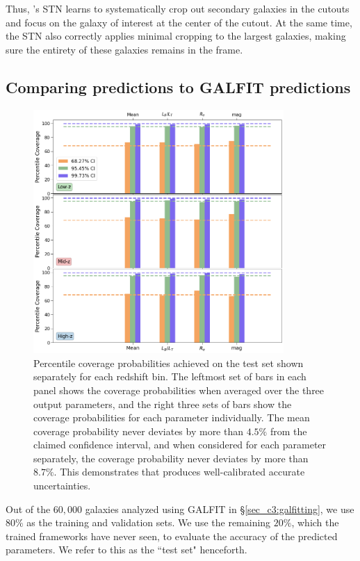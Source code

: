 Thus, \gampen{}'s STN learns to systematically crop out secondary galaxies in the cutouts and focus on the galaxy of interest at the center of the cutout. At the same time, the STN also correctly applies minimal cropping to the largest galaxies, making sure the entirety of these galaxies remains in the frame. 

\subsection{Comparing \gampen{} predictions to GALFIT predictions} \label{sec_c3:gampen_v_galfit}

\begin{figure}[htb]
    \centering
    \includegraphics[width = 0.85\textwidth]{cov_prob_all_z.png}
    \caption{Percentile coverage probabilities achieved on the test set shown separately for each redshift bin. The leftmost set of bars in each panel shows the coverage probabilities when averaged over the three output parameters, and the right three sets of bars show the coverage probabilities for each parameter individually. The mean coverage probability never deviates by more than $4.5\%$ from the claimed confidence interval, and when considered for each parameter separately, the coverage probability never deviates by more than $8.7\%$. This demonstrates that \gampen{} produces well-calibrated accurate uncertainties.}
    \label{fig_c3:cov_prob_all_z}
\end{figure}

Out of the $60,000$ galaxies analyzed using GALFIT in \S \ref{sec_c3:galfitting}, we use $80\%$ as the training and validation sets. We use the remaining $20\%$, which the trained \gampen{} frameworks have never seen, to evaluate the accuracy of the predicted parameters. We refer to this as the ``test set" henceforth.

